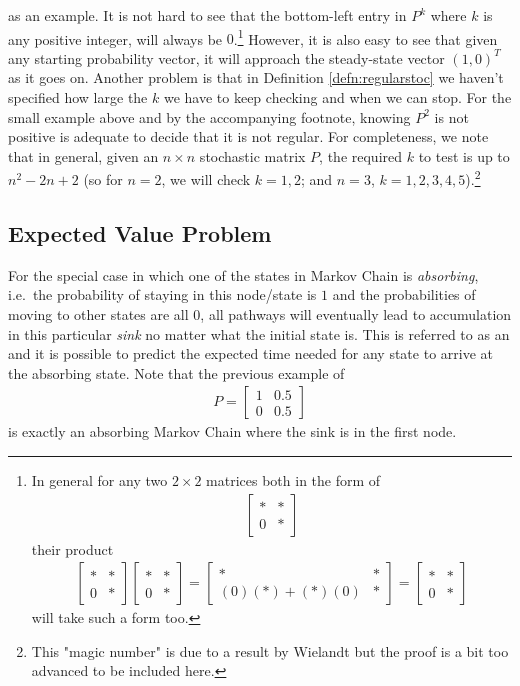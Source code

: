 as an example. It is not hard to see that the bottom-left entry in $P^k$ where $k$ is any positive integer, will always be $0$.\footnote{In general for any two $2 \times 2$ matrices both in the form of
\begin{align*}
\begin{bmatrix}
* & * \\
0 & *    
\end{bmatrix}
\end{align*} their product
\begin{align*}
\begin{bmatrix}
* & * \\
0 & *    
\end{bmatrix}
\begin{bmatrix}
* & * \\
0 & *    
\end{bmatrix}
=
\begin{bmatrix}
* & * \\
(0)(*) + (*)(0) & *    
\end{bmatrix}
=
\begin{bmatrix}
* & * \\
0 & *    
\end{bmatrix}
\end{align*} will take such a form too.} However, it is also easy to see that given any starting probability vector, it will approach the steady-state vector $(1,0)^T$ as it goes on. Another problem is that in Definition \ref{defn:regularstoc} we haven't specified how large the $k$ we have to keep checking and when we can stop. For the small example above and by the accompanying footnote, knowing $P^2$ is not positive is adequate to decide that it is not regular. For completeness, we note that in general, given an $n \times n$ stochastic matrix $P$, the required $k$ to test is up to $n^2 - 2n + 2$ (so for $n = 2$, we will check $k = 1,2$; and $n = 3$, $k = 1,2,3,4,5$).\footnote{This "magic number" is due to a result by Wielandt but the proof is a bit too advanced to be included here.}

\subsection{Expected Value Problem}
For the special case in which one of the states in Markov Chain is \textit{absorbing}, i.e.\ the probability of staying in this node/state is $1$ and the probabilities of moving to other states are all $0$, all pathways will eventually lead to accumulation in this particular \textit{sink} no matter what the initial state is. This is referred to as an  and it is possible to predict the expected time needed for any state to arrive at the absorbing state. Note that the previous example of
\begin{align*}
P = 
\begin{bmatrix}
1 & 0.5 \\
0 & 0.5
\end{bmatrix}    
\end{align*}
is exactly an absorbing Markov Chain where the sink is in the first node.
\par

